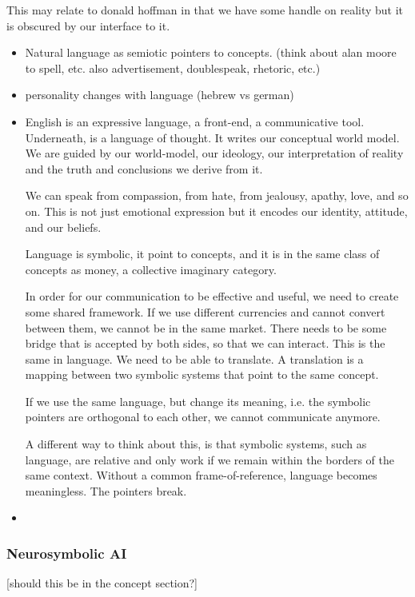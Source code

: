 This may relate to donald hoffman in that we have some handle on reality but it is obscured by our interface to it. 



\begin{itemize}
    \item Natural language as semiotic pointers to concepts. (think about alan moore to spell, etc. also advertisement, doublespeak, rhetoric, etc.)
    \item personality changes with language (hebrew vs german)
    \item English is an expressive language, a front-end, a communicative tool. Underneath, is a language of thought. It writes our conceptual world model. We are guided by our world-model, our ideology, our interpretation of reality and the truth and conclusions we derive from it. 

    We can speak from compassion, from hate, from jealousy, apathy, love, and so on. This is not just emotional expression but it encodes our identity, attitude, and our beliefs. 
    
    Language is symbolic, it point to concepts, and it is in the same class of concepts as money, a collective imaginary category.
    
    In order for our communication to be effective and useful, we need to create some shared framework. If we use different currencies and cannot convert between them, we cannot be in the same market. There needs to be some bridge that is accepted by both sides, so that we can interact. This is the same in language. We need to be able to translate. A translation is a mapping between two symbolic systems that point to the same concept.   
    
    If we use the same language, but change its meaning, i.e. the symbolic pointers are orthogonal to each other, we cannot communicate anymore. 
    
    A different way to think about this, is that symbolic systems, such as language, are relative and only work if we remain within the borders of the same context. Without a common frame-of-reference, language becomes meaningless. The pointers break.
    \item     
\end{itemize}




\subsubsection{Neurosymbolic AI}
[should this be in the concept section?]

